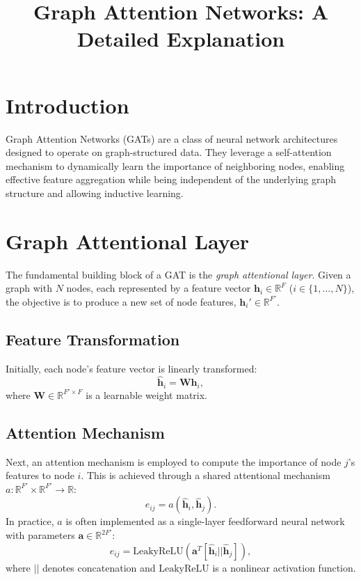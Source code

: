 \documentclass{article}
\begin{document}
	
	\title{Graph Attention Networks: A Detailed Explanation}
	\author{}
	\date{}
	\maketitle
	
	\section{Introduction}
	
	Graph Attention Networks (GATs) are a class of neural network architectures designed to operate on graph-structured data. They leverage a self-attention mechanism to dynamically learn the importance of neighboring nodes, enabling effective feature aggregation while being independent of the underlying graph structure and allowing inductive learning.
	
	\section{Graph Attentional Layer}
	
	The fundamental building block of a GAT is the \textit{graph attentional layer}. Given a graph with $N$ nodes, each represented by a feature vector $\mathbf{h}_i \in \mathbb{R}^F$ ($i \in \{1, \dots, N\}$), the objective is to produce a new set of node features, $\mathbf{h}_i' \in \mathbb{R}^{F'}$.
	
	\subsection{Feature Transformation}
	Initially, each node's feature vector is linearly transformed:
	\begin{equation}
		\hat{\mathbf{h}}_i = \mathbf{W} \mathbf{h}_i,
	\end{equation}
	where $\mathbf{W} \in \mathbb{R}^{F' \times F}$ is a learnable weight matrix.
	
	\subsection{Attention Mechanism}
	Next, an attention mechanism is employed to compute the importance of node $j$'s features to node $i$. This is achieved through a shared attentional mechanism $a: \mathbb{R}^{F'} \times \mathbb{R}^{F'} \rightarrow \mathbb{R}$:
	\begin{equation}
		e_{ij} = a(\hat{\mathbf{h}}_i, \hat{\mathbf{h}}_j).
	\end{equation}
	In practice, $a$ is often implemented as a single-layer feedforward neural network with parameters $\mathbf{a} \in \mathbb{R}^{2F'}$:
	\begin{equation}
		e_{ij} = \text{LeakyReLU}\left( \mathbf{a}^T [\hat{\mathbf{h}}_i || \hat{\mathbf{h}}_j] \right),
	\end{equation}
	where $||$ denotes concatenation and $\text{LeakyReLU}$ is a nonlinear activation function.
	
\end{document}
